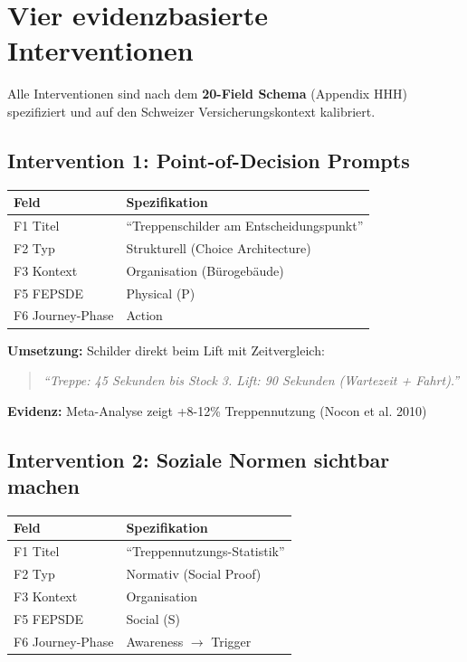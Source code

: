 \documentclass[11pt,a4paper]{article}
\begin{document}
\newpage

\section{\textcolor{fehrblue}{Vier evidenzbasierte Interventionen}}

Alle Interventionen sind nach dem \textbf{20-Field Schema} (Appendix HHH) spezifiziert und auf den Schweizer Versicherungskontext kalibriert.

\subsection{Intervention 1: Point-of-Decision Prompts}

\begin{table}[h]
\centering
\begin{tabular}{ll}
\toprule
\textbf{Feld} & \textbf{Spezifikation} \\
\midrule
F1 Titel & ``Treppenschilder am Entscheidungspunkt'' \\
F2 Typ & Strukturell (Choice Architecture) \\
F3 Kontext & Organisation (Bürogebäude) \\
F5 FEPSDE & Physical (P) \\
F6 Journey-Phase & Action \\
\bottomrule
\end{tabular}
\end{table}

\textbf{Umsetzung:} Schilder direkt beim Lift mit Zeitvergleich:
\begin{quote}
\textit{``Treppe: 45 Sekunden bis Stock 3. Lift: 90 Sekunden (Wartezeit + Fahrt).''}
\end{quote}

\textbf{Evidenz:} Meta-Analyse zeigt +8-12\% Treppennutzung (Nocon et al. 2010)

\subsection{Intervention 2: Soziale Normen sichtbar machen}

\begin{table}[h]
\centering
\begin{tabular}{ll}
\toprule
\textbf{Feld} & \textbf{Spezifikation} \\
\midrule
F1 Titel & ``Treppennutzungs-Statistik'' \\
F2 Typ & Normativ (Social Proof) \\
F3 Kontext & Organisation \\
F5 FEPSDE & Social (S) \\
F6 Journey-Phase & Awareness $\rightarrow$ Trigger \\
\bottomrule
\end{tabular}
\end{table}
\end{document}
